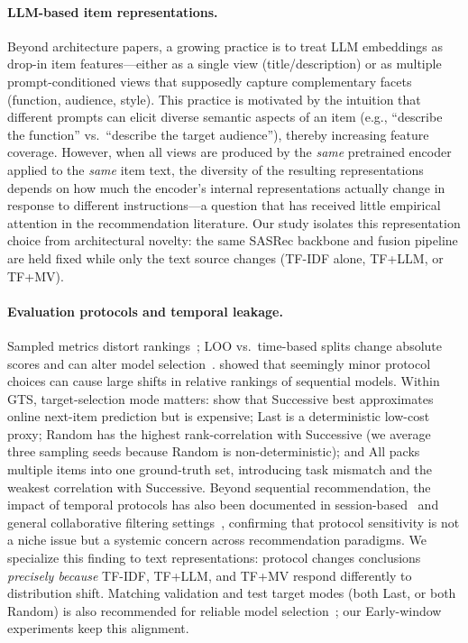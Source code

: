 \documentclass[sigconf,natbib=true,anonymous]{acmart}
\newcommand{\tfidf}{\textsc{TF-IDF}\xspace}
\newcommand{\tfllm}{\textsc{TF+LLM}\xspace}
\newcommand{\tfmv}{\textsc{TF+MV}\xspace}
\begin{document}
\paragraph{LLM-based item representations.}
Beyond architecture papers, a growing practice is to treat LLM embeddings as drop-in item features---either as a single view (title/description) or as multiple prompt-conditioned views that supposedly capture complementary facets (function, audience, style).
This practice is motivated by the intuition that different prompts can elicit diverse semantic aspects of an item (e.g., ``describe the function'' vs.\ ``describe the target audience''), thereby increasing feature coverage.
However, when all views are produced by the \emph{same} pretrained encoder applied to the \emph{same} item text, the diversity of the resulting representations depends on how much the encoder's internal representations actually change in response to different instructions---a question that has received little empirical attention in the recommendation literature.
Our study isolates this representation choice from architectural novelty: the same SASRec backbone and fusion pipeline are held fixed while only the text source changes (\tfidf alone, \tfllm, or \tfmv).

\paragraph{Evaluation protocols and temporal leakage.}
Sampled metrics distort rankings~\cite{krichene2020sampledmetrics}; LOO vs.\ time-based splits change absolute scores and can alter model selection~\cite{ji2023evaluation,sun2023reevaluation,meng2020temporal}.
\citet{hidasi2018recurrent} showed that seemingly minor protocol choices can cause large shifts in relative rankings of sequential models.
Within GTS, target-selection mode matters: \citet{gusak2025time} show that Successive best approximates online next-item prediction but is expensive; Last is a deterministic low-cost proxy; Random has the highest rank-correlation with Successive (we average three sampling seeds because Random is non-deterministic); and All packs multiple items into one ground-truth set, introducing task mismatch and the weakest correlation with Successive.
Beyond sequential recommendation, the impact of temporal protocols has also been documented in session-based~\cite{hidasi2018recurrent} and general collaborative filtering settings~\cite{meng2020temporal}, confirming that protocol sensitivity is not a niche issue but a systemic concern across recommendation paradigms.
We specialize this finding to text representations: protocol changes conclusions \emph{precisely because} \tfidf, \tfllm, and \tfmv respond differently to distribution shift.
Matching validation and test target modes (both Last, or both Random) is also recommended for reliable model selection~\cite{gusak2025time}; our Early-window experiments keep this alignment.
\end{document}
